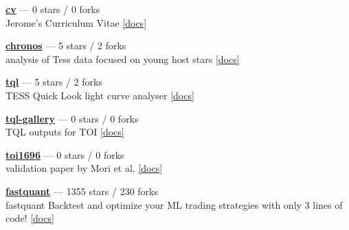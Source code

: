 \item \href{https://github.com/jpdeleon/cv}{{\bf cv}} --- 0 stars / 0 forks \\
Jerome's Curriculum Vitae \href{https://raw.githubusercontent.com/jpdeleon/cv/main-pdf/tex/cv_pubs.pdf}{[docs]}

\item \href{https://github.com/jpdeleon/chronos}{{\bf chronos}} --- 5 stars / 2 forks \\
analysis of Tess data focused on young host stars \href{None}{[docs]}

\item \href{https://github.com/jpdeleon/tql}{{\bf tql}} --- 5 stars / 2 forks \\
TESS Quick Look light curve analyser \href{None}{[docs]}

\item \href{https://github.com/jpdeleon/tql-gallery}{{\bf tql-gallery}} --- 0 stars / 0 forks \\
TQL outputs for TOI \href{None}{[docs]}

\item \href{https://github.com/jpdeleon/toi1696}{{\bf toi1696}} --- 0 stars / 0 forks \\
validation paper by Mori et al. \href{None}{[docs]}

\item \href{https://github.com/enzoampil/fastquant}{{\bf fastquant}} --- 1355 stars / 230 forks \\
fastquant {\textemdash} Backtest and optimize your ML trading strategies with only 3 lines of code! \href{}{[docs]}